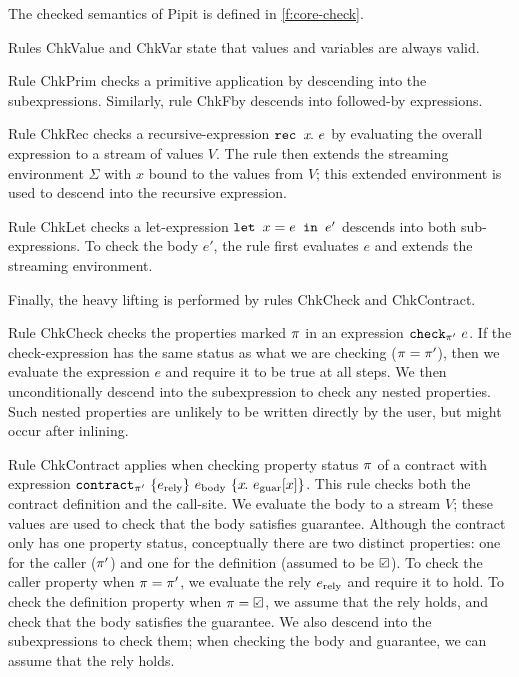 

The checked semantics of Pipit is defined in \autoref{f:core-check}.

Rules {\sc ChkValue} and {\sc ChkVar} state that values and variables are always valid.

Rule {\sc ChkPrim} checks a primitive application by descending into the subexpressions.
Similarly, rule {\sc ChkFby} descends into followed-by expressions.

Rule {\sc ChkRec} checks a recursive-expression $\texttt{rec~} x\hspace{-0.1em}.~e$ by evaluating the overall expression to a stream of values $V$.
The rule then extends the streaming environment $\Sigma$ with $x$ bound to the values from $V$; this extended environment is used to descend into the recursive expression.

Rule {\sc ChkLet} checks a let-expression $\texttt{let~} x = e \texttt{~in~} e'$ descends into both sub-expressions.
To check the body $e'$, the rule first evaluates $e$ and extends the streaming environment.

Finally, the heavy lifting is performed by rules {\sc ChkCheck} and {\sc ChkContract}.

Rule {\sc ChkCheck} checks the properties marked $\pi$ in an expression $\texttt{check}_{\pi'}~e$.
If the check-expression has the same status as what we are checking ($\pi = \pi'$), then we evaluate the expression $e$ and require it to be true at all steps.
We then unconditionally descend into the subexpression to check any nested properties.
Such nested properties are unlikely to be written directly by the user, but might occur after inlining.

Rule {\sc ChkContract} applies when checking property status $\pi$ of a contract with expression $\texttt{contract}_{\pi'}~\{e_{\text{rely}}\}~e_{\text{body}}~\{x\hspace{-0.1em}.~e_{\text{guar}}[x]\}$.
This rule checks both the contract definition and the call-site.
We evaluate the body to a stream $V$; these values are used to check that the body satisfies guarantee.
Although the contract only has one property status, conceptually there are two distinct properties: one for the caller ($\pi'$) and one for the definition (assumed to be $\PSValid$).
To check the caller property when $\pi = \pi'$, we evaluate the rely $e_{\text{rely}}$ and require it to hold.
To check the definition property when $\PStatus = \PSValid$, we assume that the rely holds, and check that the body satisfies the guarantee.
We also descend into the subexpressions to check them; when checking the body and guarantee, we can assume that the rely holds.

